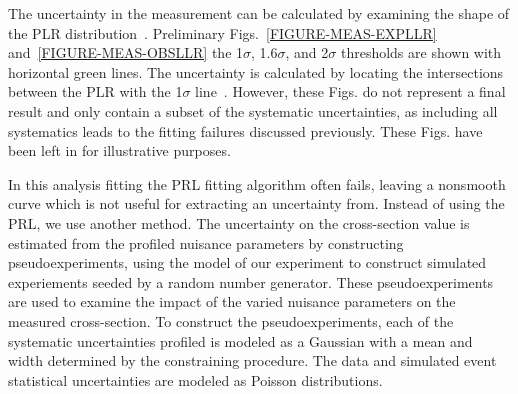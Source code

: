 
The uncertainty in the measurement can be calculated by examining the shape of the PLR distribution~\cite{ProfileLikelihoodUncertainty}. Preliminary Figs.~\ref{FIGURE-MEAS-EXPLLR} and~\ref{FIGURE-MEAS-OBSLLR} the 1$\sigma$, 1.6$\sigma$, and 2$\sigma$ thresholds are shown with horizontal green lines. The uncertainty is calculated by locating the intersections between the PLR with the 1$\sigma$ line~\cite{ProfileLikelihoodUncertainty}. However, these Figs. do not represent a final result and only contain a subset of the systematic uncertainties, as including all systematics leads to the fitting failures discussed previously.  These Figs. have been left in for illustrative purposes.

In this analysis fitting the PRL fitting algorithm often fails, leaving a nonsmooth curve which is not useful for extracting an uncertainty from. Instead of using the PRL, we use another method. The uncertainty on the cross-section value is estimated from the profiled nuisance parameters by constructing pseudoexperiments, using the model of our experiment to construct simulated experiements seeded by a random number generator. These pseudoexperiments are used to examine the impact of the varied nuisance parameters on the measured cross-section. To construct the pseudoexperiments, each of the systematic uncertainties profiled is modeled as a Gaussian with a mean and width determined by the constraining procedure. The data and simulated event statistical uncertainties are modeled as Poisson distributions. 

